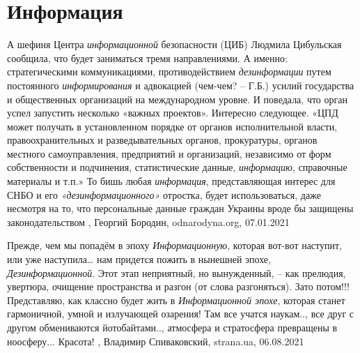  
 
 
 
 
\chapter{Информация}
\label{sec:slova.informacia}

А  шефиня Центра \emph{информационной} безопасности (ЦИБ) Людмила Цибульская
сообщила, что будет заниматься тремя направлениями. А именно: стратегическими
коммуникациями, противодействием \emph{дезинформации} путем постоянного
\emph{информирования} и адвокацией (чем-чем? – Г.Б.) усилий государства и
общественных организаций на международном уровне. И поведала, что орган успел
запустить несколько «важных проектов».  Интересно следующее. «ЦПД может
получать в установленном порядке от органов исполнительной власти,
правоохранительных и разведывательных органов, прокуратуры, органов местного
самоуправления, предприятий и организаций, независимо от форм собственности и
подчинения, статистические данные, \emph{информацию}, справочные материалы и
т.п.» То бишь любая \emph{информация}, представляющая интерес для СНБО и его
\emph{«дезинформационного»} отростка, будет использоваться, даже несмотря на
то, что персональные данные граждан Украины вроде бы защищены законодательством
, Георгий Бородин, odnarodyna.org, 07.01.2021


Прежде, чем мы попадём в эпоху \emph{Информационную}, которая вот-вот наступит,
или уже наступила… нам придется пожить в нынешней эпохе,
\emph{Дезинформационной}.  Этот этап неприятный, но вынужденный, – как
прелюдия, увертюра, очищение пространства и разгон (от слова разгоняться).
Зато потом!!!  Представляю, как классно будет жить в \emph{Информационной
эпохе}, которая станет гармоничной, умной и излучающей озарения!  Там все
учатся наукам.., все друг с другом обмениваются йотобайтами.., атмосфера и
стратосфера превращены в ноосферу... Красота!
, 
Владимир Спиваковский, strana.ua, 06.08.2021
